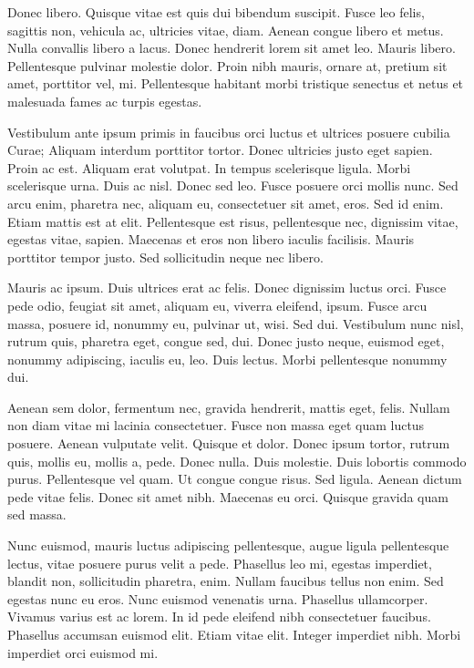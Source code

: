 \documentclass{article}
\begin{document}
Donec libero. Quisque vitae est quis dui bibendum suscipit. Fusce leo
felis, sagittis non, vehicula ac, ultricies vitae, diam. Aenean congue libero
et metus. Nulla convallis libero a lacus. Donec hendrerit lorem sit amet leo.
Mauris libero. Pellentesque pulvinar molestie dolor. Proin nibh mauris, ornare
at, pretium sit amet, porttitor vel, mi. Pellentesque habitant morbi tristique
senectus et netus et malesuada fames ac turpis egestas.

Vestibulum ante ipsum primis in faucibus orci luctus et ultrices posuere
cubilia Curae; Aliquam interdum porttitor tortor. Donec ultricies justo eget
sapien. Proin ac est. Aliquam erat volutpat. In tempus scelerisque ligula.
Morbi scelerisque urna. Duis ac nisl. Donec sed leo. Fusce posuere orci mollis
nunc.
Sed arcu enim, pharetra nec, aliquam eu, consectetuer sit amet, eros. Sed id
enim. Etiam mattis est at elit. Pellentesque est risus, pellentesque nec,
dignissim vitae, egestas vitae, sapien. Maecenas et eros non libero iaculis
facilisis. Mauris porttitor tempor justo. Sed sollicitudin neque nec libero.

Mauris ac ipsum. Duis ultrices erat ac felis. Donec dignissim luctus orci.
Fusce pede odio, feugiat sit amet, aliquam eu, viverra eleifend, ipsum. Fusce
arcu massa, posuere id, nonummy eu, pulvinar ut, wisi. Sed dui. Vestibulum nunc
nisl, rutrum quis, pharetra eget, congue sed, dui. Donec justo neque, euismod
eget, nonummy adipiscing, iaculis eu, leo. Duis lectus. Morbi pellentesque
nonummy dui.

Aenean sem dolor, fermentum nec, gravida hendrerit, mattis eget, felis.
Nullam non diam vitae mi lacinia consectetuer. Fusce non massa eget quam luctus
posuere. Aenean vulputate velit. Quisque et dolor. Donec ipsum tortor, rutrum
quis, mollis eu, mollis a, pede. Donec nulla. Duis molestie. Duis lobortis
commodo purus. Pellentesque vel quam. Ut congue congue risus. Sed ligula.
Aenean dictum pede vitae felis. Donec sit amet nibh. Maecenas eu orci. Quisque
gravida quam sed massa.

Nunc euismod, mauris luctus adipiscing pellentesque, augue ligula
pellentesque lectus, vitae posuere purus velit a pede. Phasellus leo mi,
egestas imperdiet, blandit non, sollicitudin pharetra, enim. Nullam faucibus
tellus non enim. Sed egestas nunc eu eros. Nunc euismod venenatis urna.
Phasellus ullamcorper. Vivamus varius est ac lorem. In id pede eleifend nibh
consectetuer faucibus. Phasellus accumsan euismod elit. Etiam vitae elit.
Integer imperdiet nibh. Morbi imperdiet orci euismod mi.
\end{document}
